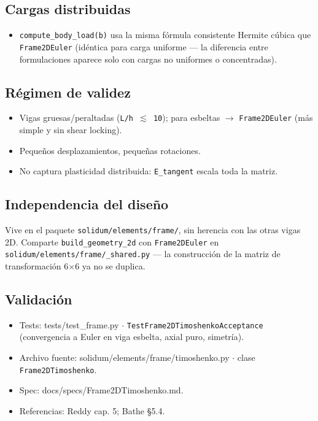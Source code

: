 \documentclass[11pt,letterpaper,oneside]{report}
\begin{document}
\subsection{Cargas distribuidas}
\begin{itemize}
  \item \texttt{compute\_body\_load(b)} usa la misma fórmula consistente Hermite cúbica que \texttt{Frame2DEuler} (idéntica para carga uniforme --- la diferencia entre formulaciones aparece solo con cargas no uniformes o concentradas).
\end{itemize}

\subsection{Régimen de validez}
\begin{itemize}
  \item Vigas gruesas/peraltadas (\texttt{L/h \ensuremath{\lesssim} 10}); para esbeltas \ensuremath{\to} \texttt{Frame2DEuler} (más simple y sin shear locking).
  \item Pequeños desplazamientos, pequeñas rotaciones.
  \item No captura plasticidad distribuida: \texttt{E\_tangent} escala toda la matriz.
\end{itemize}

\subsection{Independencia del diseño}
Vive en el paquete \texttt{solidum/elements/frame/}, sin herencia con las otras vigas 2D. Comparte \texttt{build\_geometry\_2d} con \texttt{Frame2DEuler} en \texttt{solidum/elements/frame/\_shared.py} --- la construcción de la matriz de transformación 6\ensuremath{\times}6 ya no se duplica.

\subsection{Validación}
\begin{itemize}
  \item Tests: tests/test\_frame.py \ensuremath{\cdot} \texttt{TestFrame2DTimoshenkoAcceptance} (convergencia a Euler en viga esbelta, axial puro, simetría).
  \item Archivo fuente: solidum/elements/frame/timoshenko.py \ensuremath{\cdot} clase \texttt{Frame2DTimoshenko}.
  \item Spec: docs/specs/Frame2DTimoshenko.md.
  \item Referencias: Reddy cap. 5; Bathe §5.4.
\end{itemize}
\end{document}
